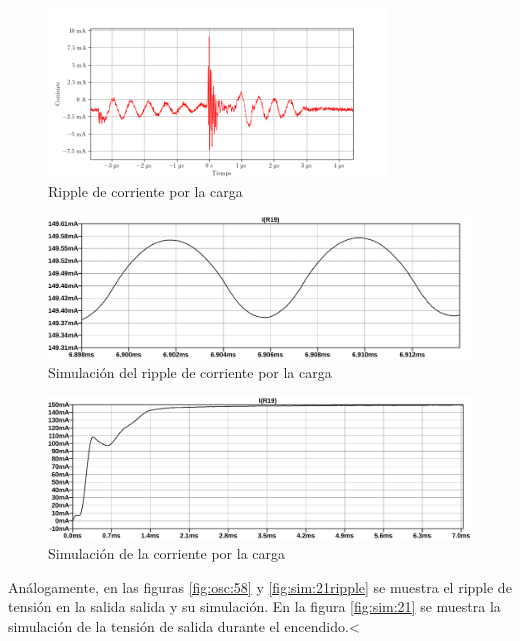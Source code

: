 \begin{figure}[H]
    \centering
    \includegraphics[width=0.8\textwidth]{images/capturas-osciloscopio/17-11-2022/67.png}
    \caption{Ripple de corriente por la carga}
    \label{fig:osc:67}
\end{figure}

\begin{figure}[H]
    \centering
    \includegraphics[width=\textwidth]{images/sim/14-ripple.pdf}
    \caption{Simulación del ripple de corriente por la carga}
    \label{fig:sim:14ripple}
\end{figure}

\begin{figure}[H]
    \centering
    \includegraphics[width=\textwidth]{images/sim/14.pdf}
    \caption{Simulación de la corriente por la carga}
    \label{fig:sim:14}
\end{figure}

Análogamente, en las figuras \ref{fig:osc:58} y \ref{fig:sim:21ripple} se muestra el ripple de tensión en la salida salida y su simulación. En la figura \ref{fig:sim:21} se muestra la simulación de la tensión de salida durante el encendido.<

